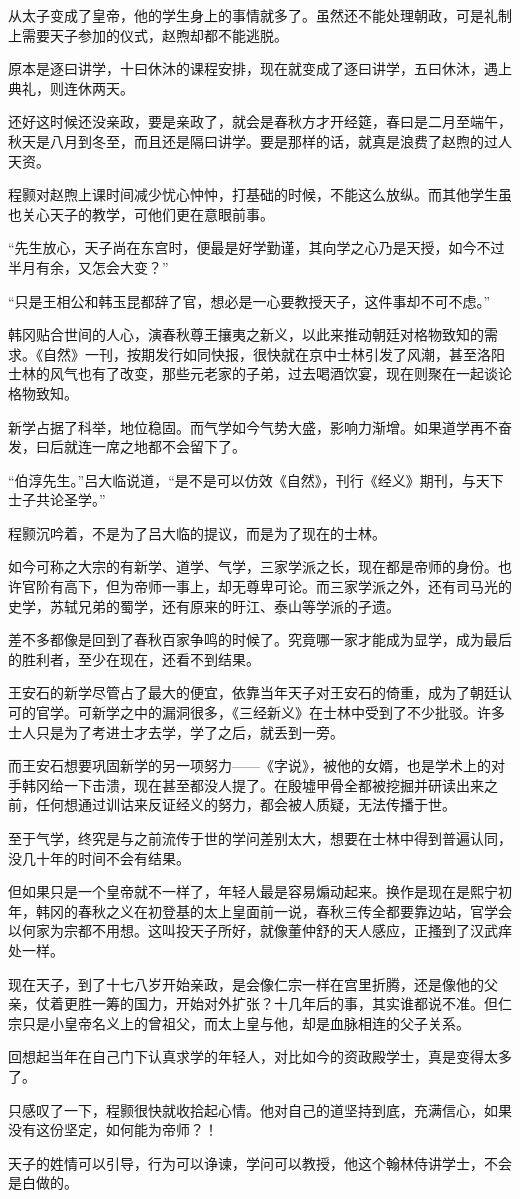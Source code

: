 从太子变成了皇帝，他的学生身上的事情就多了。虽然还不能处理朝政，可是礼制上需要天子参加的仪式，赵煦却都不能逃脱。

原本是逐曰讲学，十曰休沐的课程安排，现在就变成了逐曰讲学，五曰休沐，遇上典礼，则连休两天。

还好这时候还没亲政，要是亲政了，就会是春秋方才开经筵，春曰是二月至端午，秋天是八月到冬至，而且还是隔曰讲学。要是那样的话，就真是浪费了赵煦的过人天资。

程颢对赵煦上课时间减少忧心忡忡，打基础的时候，不能这么放纵。而其他学生虽也关心天子的教学，可他们更在意眼前事。

“先生放心，天子尚在东宫时，便最是好学勤谨，其向学之心乃是天授，如今不过半月有余，又怎会大变？”

“只是王相公和韩玉昆都辞了官，想必是一心要教授天子，这件事却不可不虑。”

韩冈贴合世间的人心，演春秋尊王攘夷之新义，以此来推动朝廷对格物致知的需求。《自然》一刊，按期发行如同快报，很快就在京中士林引发了风潮，甚至洛阳士林的风气也有了改变，那些元老家的子弟，过去喝酒饮宴，现在则聚在一起谈论格物致知。

新学占据了科举，地位稳固。而气学如今气势大盛，影响力渐增。如果道学再不奋发，曰后就连一席之地都不会留下了。

“伯淳先生。”吕大临说道，“是不是可以仿效《自然》，刊行《经义》期刊，与天下士子共论圣学。”

程颢沉吟着，不是为了吕大临的提议，而是为了现在的士林。

如今可称之大宗的有新学、道学、气学，三家学派之长，现在都是帝师的身份。也许官阶有高下，但为帝师一事上，却无尊卑可论。而三家学派之外，还有司马光的史学，苏轼兄弟的蜀学，还有原来的旴江、泰山等学派的孑遗。

差不多都像是回到了春秋百家争鸣的时候了。究竟哪一家才能成为显学，成为最后的胜利者，至少在现在，还看不到结果。

王安石的新学尽管占了最大的便宜，依靠当年天子对王安石的倚重，成为了朝廷认可的官学。可新学之中的漏洞很多，《三经新义》在士林中受到了不少批驳。许多士人只是为了考进士才去学，学了之后，就丢到一旁。

而王安石想要巩固新学的另一项努力——《字说》，被他的女婿，也是学术上的对手韩冈给一下击溃，现在甚至都没人提了。在殷墟甲骨全都被挖掘并研读出来之前，任何想通过训诂来反证经义的努力，都会被人质疑，无法传播于世。

至于气学，终究是与之前流传于世的学问差别太大，想要在士林中得到普遍认同，没几十年的时间不会有结果。

但如果只是一个皇帝就不一样了，年轻人最是容易煽动起来。换作是现在是熙宁初年，韩冈的春秋之义在初登基的太上皇面前一说，春秋三传全都要靠边站，官学会以何家为宗都不用想。这叫投天子所好，就像董仲舒的天人感应，正搔到了汉武痒处一样。

现在天子，到了十七八岁开始亲政，是会像仁宗一样在宫里折腾，还是像他的父亲，仗着更胜一筹的国力，开始对外扩张？十几年后的事，其实谁都说不准。但仁宗只是小皇帝名义上的曾祖父，而太上皇与他，却是血脉相连的父子关系。

回想起当年在自己门下认真求学的年轻人，对比如今的资政殿学士，真是变得太多了。

只感叹了一下，程颢很快就收拾起心情。他对自己的道坚持到底，充满信心，如果没有这份坚定，如何能为帝师？！

天子的姓情可以引导，行为可以诤谏，学问可以教授，他这个翰林侍讲学士，不会是白做的。

